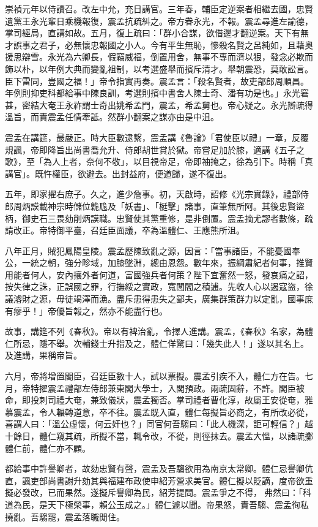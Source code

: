\begin{pinyinscope}
崇禎元年以侍讀召。改左中允，充日講官。三年春，輔臣定逆案者相繼去國，忠賢遺黨王永光輩日乘機報復，震孟抗疏糾之。帝方眷永光，不報。震孟尋進左諭德，掌司經局，直講如故。五月，復上疏曰：「群小合謀，欲借邊才翻逆案。天下有無才誤事之君子，必無懷忠報國之小人。今有平生無恥，慘殺名賢之呂純如，且藉奧援思辯雪。永光為六卿長，假竊威福，倒置用舍，無事不專而濟以狠，發念必欺而飾以朴，以年例大典而變亂祖制，以考選盛舉而擯斥清才。舉朝震恐，莫敢訟言。臣下雷同，豈國之福！」帝令指實再奏。震孟言：「殺名賢者，故吏部郎周順昌。年例則抑吏科都給事中陳良訓，考選則擯中書舍人陳士奇、潘有功是也。」永光窘甚，密結大奄王永祚謂士奇出姚希孟門，震孟，希孟舅也。帝心疑之。永光辯疏得溫旨，而責震孟任情牽詆。然群小翻案之謀亦由是中沮。

震孟在講筵，最嚴正。時大臣數逮繫，震孟講《魯論》「君使臣以禮」一章，反覆規諷，帝即降旨出尚書喬允升、侍郎胡世賞於獄。帝嘗足加於膝，適講《五子之歌》，至「為人上者，奈何不敬」，以目視帝足，帝即袖掩之，徐為引下。時稱「真講官」。既忤權臣，欲避去。出封益府，便道歸，遂不復出。

五年，即家擢右庶子。久之，進少詹事。初，天啟時，詔修《光宗實錄》，禮部侍郎周炳謨載神宗時儲位臲卼及「妖書」、「梃擊」諸事，直筆無所阿。其後忠賢盜柄，御史石三畏劾削炳謨職。忠賢使其黨重修，是非倒置。震孟摘尤謬者數條，疏請改正。帝特御平臺，召廷臣面議，卒為溫體仁、王應熊所沮。

八年正月，賊犯鳳陽皇陵。震孟歷陳致亂之源，因言：「當事諸臣，不能憂國奉公，一統之朝，強分畛域，加膝墜淵，總由恩怨。數年來，振綱肅紀者何事，推賢用能者何人，安內攘外者何道，富國強兵者何策？陛下宜奮然一怒，發哀痛之詔，按失律之誅，正誤國之罪，行撫綏之實政，寬閭閻之積逋。先收人心以遏寇盜，徐議濬財之源，毋徒竭澤而漁。盡斥患得患失之鄙夫，廣集群策群力以定亂，國事庶有瘳乎！」帝優旨報之，然亦不能盡行也。

故事，講筵不列《春秋》。帝以有裨治亂，令擇人進講。震孟，《春秋》名家，為體仁所忌，隱不舉。次輔錢士升指及之，體仁佯驚曰：「幾失此人！」遂以其名上。及進講，果稱帝旨。

六月，帝將增置閣臣，召廷臣數十人，試以票擬。震孟引疾不入，體仁方在告。七月，帝特擢震孟禮部左侍郎兼東閣大學士，入閣預政。兩疏固辭，不許。閣臣被命，即投刺司禮大奄，兼致儀狀，震孟獨否。掌司禮者曹化淳，故屬王安從奄，雅慕震孟，令人輾轉道意，卒不往。震孟既入直，體仁每擬旨必商之，有所改必從，喜謂人曰：「溫公虛懷，何云奸也？」同官何吾騶曰：「此人機深，詎可輕信？」越十餘日，體仁窺其疏，所擬不當，輒令改，不從，則徑抹去。震孟大慍，以諸疏擲體仁前，體仁亦不顧。

都給事中許譽卿者，故劾忠賢有聲，震孟及吾騶欲用為南京太常卿。體仁忌譽卿伉直，諷吏部尚書謝升劾其與福建布政使申紹芳營求美官。體仁擬以貶謫，度帝欲重擬必發改，已而果然。遂擬斥譽卿為民，紹芳提問。震孟爭之不得，弗然曰：「科道為民，是天下極榮事，賴公玉成之。」體仁遽以聞。帝果怒，責吾騶、震孟徇私撓亂。吾騶罷，震孟落職閒住。


\end{pinyinscope}
